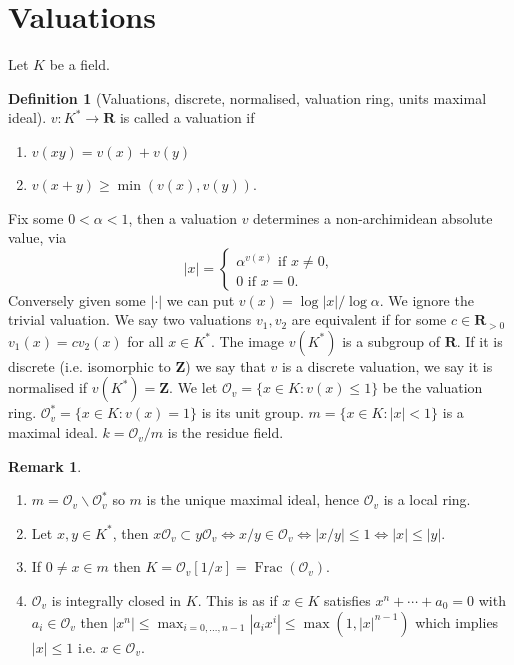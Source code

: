 \documentclass[10pt,]{book}
\newcommand{\lt}{<}
\newcommand{\gt}{>}
\theoremstyle{plain}
\theoremstyle{definition}
\newtheorem{definition}[theorem]{Definition}
\newtheorem{remark}[theorem]{Remark}
\newcommand{\RR}{\mathbf{R}}
\newcommand{\ZZ}{\mathbf{Z}}
\newcommand{\cO}{\mathcal{O}}
\newcommand{\ab}{|\cdot|}
\DeclareMathOperator{\Frac}{Frac}
\begin{document}
\section[Valuations]{Valuations}\label{sec-valuations}
Let \(K\) be a field.%
\begin{definition}[Valuations, discrete, normalised, valuation ring, units maximal ideal]\label{definition-6}
\(v\colon K^* \to \RR\) is called a valuation if
            \begin{enumerate}
\item{}\(v(xy) = v(x)+v(y)\)\item{}\(v(x+y) \ge \min(v(x),v(y))\).\end{enumerate}

            Fix some \(0\lt \alpha\lt 1\), then a valuation \(v\) determines a non-archimidean absolute value, via \[|x| = \begin{cases} \alpha^{v(x)} \text{ if } x \ne 0,\\ 0 \text{ if } x =0.\end{cases}\]
            Conversely given some \(\ab\) we can put \(v(x) = \log|x| / \log\alpha\).
            We ignore the trivial valuation.
            We say two valuations \(v_1,v_2\) are equivalent if for some \(c\in \RR_{\gt 0}\)\( v_1(x )= cv_2(x)\) for all \(x\in K^*\).
            The image \(v(K^*)\) is a subgroup of \(\RR\).
            If it is discrete (i.e. isomorphic to \(\ZZ\)) we say that \(v\) is a discrete valuation, we say it is normalised if \(v(K^*) = \ZZ\).
            We let \(\cO_v = \{x \in K : v(x) \le 1\}\) be the valuation ring.
            \(\cO_v^* = \{x \in K : v(x) = 1\}\) is its unit group.
            \(m = \{x\in K: |x| \lt 1\}\) is a maximal ideal.
            \(k =\cO_v/m\) is the residue field.
          \end{definition}
\begin{remark}\label{remark-4}
\begin{enumerate}
\item{}\(m = \cO_v \smallsetminus \cO_v^*\) so \(m\) is the unique maximal ideal, hence \(\cO_v\) is a local ring.\item{}Let \(x,y \in K^*\), then \(x\cO_v \subset y\cO_v \iff x/y \in \cO_v\iff |x/y| \le 1\iff |x| \le |y|\).\item{}If \(0 \ne x \in m\) then \(K = \cO_v[1/x] = \Frac(\cO_v)\).\item{}\(\cO_v\) is integrally closed in \(K\).
              This is as if \(x\in K\) satisfies \(x^n + \cdots + a_0 = 0\) with \(a_i \in \cO_v\) then \(|x^n| \le \max_{i = 0,\ldots,n-1} |a_ix^i| \le \max(1,|x|^{n-1})\) which implies \(|x| \le 1\) i.e. \(x\in \cO_v\).\end{enumerate}
\end{remark}
\end{document}
